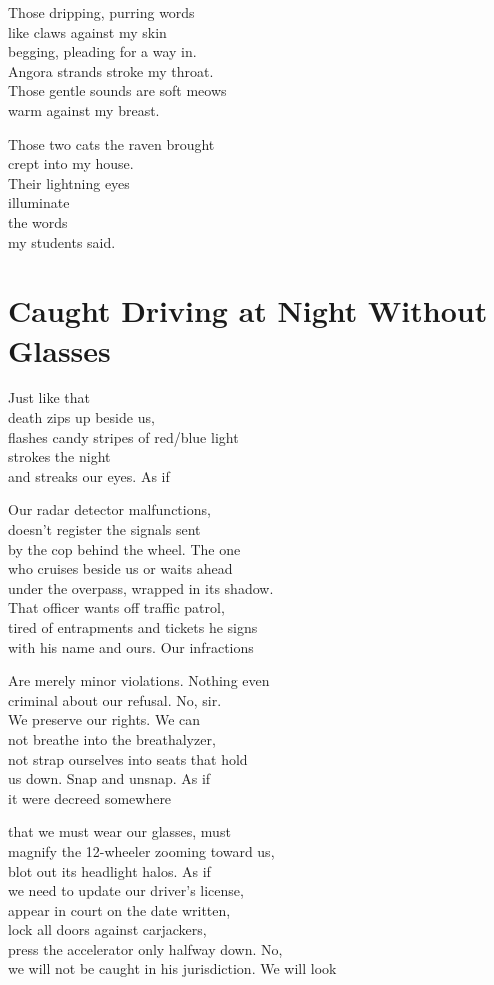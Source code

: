 \documentclass[twoside,10pt]{book}
\begin{document}
Those dripping, purring words\\
like claws against my skin\\
begging, pleading for a way in.\\
Angora strands stroke my throat.\\
Those gentle sounds are soft meows\\
warm against my breast.

Those two cats the raven brought\\
crept into my house.\\
Their lightning eyes\\
illuminate\\
the words\\
my students said.


\clearpage
\section{Caught Driving at Night Without Glasses}

Just like that\\
death zips up beside us,\\
flashes candy stripes of red/blue light\\
strokes the night\\
and streaks our eyes. As if

Our radar detector malfunctions,\\
doesn't register the signals sent\\
by the cop behind the wheel. The one\\
who cruises beside us or waits ahead\\
under the overpass, wrapped in its shadow.\\
That officer wants off traffic patrol,\\
tired of entrapments and tickets he signs\\
with his name and ours. Our infractions

Are merely minor violations. Nothing even\\
criminal about our refusal. No, sir.\\
We preserve our rights. We can\\
not breathe into the breathalyzer,\\
not strap ourselves into seats that hold\\
us down. Snap and unsnap. As if\\
it were decreed somewhere

that we must wear our glasses, must\\
magnify the 12-wheeler zooming toward us,\\
blot out its headlight halos. As if\\
we need to update our driver's license,\\
appear in court on the date written,\\
lock all doors against carjackers,\\
press the accelerator only halfway down. No,\\
we will not be caught in his jurisdiction. We will look
\end{document}
